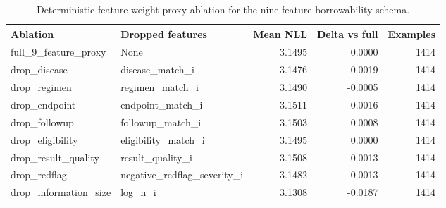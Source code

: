 \begin{table}[htbp]
\centering
\small
\caption{Deterministic feature-weight proxy ablation for the nine-feature borrowability schema.}
\label{tab:feature-ablation}
\begin{tabular}{llrrr}
\toprule
Ablation & Dropped features & Mean NLL & Delta vs full & Examples \\
\midrule
full\_9\_feature\_proxy & None & 3.1495 & 0.0000 & 1414 \\
drop\_disease & disease\_match\_i & 3.1476 & -0.0019 & 1414 \\
drop\_regimen & regimen\_match\_i & 3.1490 & -0.0005 & 1414 \\
drop\_endpoint & endpoint\_match\_i & 3.1511 & 0.0016 & 1414 \\
drop\_followup & followup\_match\_i & 3.1503 & 0.0008 & 1414 \\
drop\_eligibility & eligibility\_match\_i & 3.1495 & 0.0000 & 1414 \\
drop\_result\_quality & result\_quality\_i & 3.1508 & 0.0013 & 1414 \\
drop\_redflag & negative\_redflag\_severity\_i & 3.1482 & -0.0013 & 1414 \\
drop\_information\_size & log\_n\_i & 3.1308 & -0.0187 & 1414 \\
\bottomrule
\end{tabular}
\end{table}
